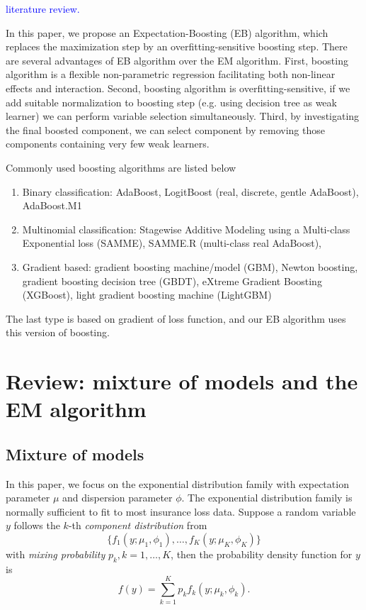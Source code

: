 \documentclass[11pt]{article}
\numberwithin{equation}{section}
\newcommand{\blue}[1]{\textcolor{blue}{#1}}
\begin{document}
\blue{literature review.}

In this paper, we propose an Expectation-Boosting (EB) algorithm, which replaces the maximization step by an overfitting-sensitive boosting step. 
There are several advantages of EB algorithm over the EM algorithm. 
First, boosting algorithm is a flexible non-parametric regression facilitating both non-linear effects and interaction. 
Second, boosting algorithm is overfitting-sensitive, if we add suitable normalization to boosting step (e.g. using decision tree as weak learner) we can perform variable selection simultaneously. 
Third, by investigating the final boosted component, we can select component by removing those components containing very few weak learners. 


Commonly used boosting algorithms are listed below
	\begin{enumerate}
		
		\item Binary classification: {AdaBoost}, LogitBoost (real, discrete, gentle AdaBoost), AdaBoost.M1
		
		\item Multinomial classification: Stagewise Additive Modeling using a Multi-class Exponential loss (SAMME), SAMME.R (multi-class real AdaBoost),
		\item {Gradient based}: {gradient boosting machine/model (GBM)}, Newton boosting, gradient boosting decision tree (GBDT), {eXtreme Gradient Boosting (XGBoost)}, {light gradient boosting machine (LightGBM)}
	\end{enumerate}
	
	The last type is based on {gradient of loss function}, and our EB algorithm uses this version of boosting.

\section{Review: mixture of models and the EM algorithm}


\subsection{Mixture of models}\label{review:mix1}
In this paper, we focus on the exponential distribution family with expectation parameter $\mu$ and dispersion parameter $\phi$. The exponential distribution family is normally sufficient to fit to most insurance loss data.
	Suppose a random variable $y$ follows the $k$-th {\it component distribution} from
	$$\{f_1(y;\mu_1,\phi_1),\ldots,f_K(y;\mu_K,\phi_K)\}$$
	with \textit{mixing probability} $p_k, k=1,\ldots,K$,
	then the probability density function for $y$ is
	$$f(y)=\sum_{k=1}^Kp_kf_k(y;\mu_k,\phi_k).$$
\end{document}
